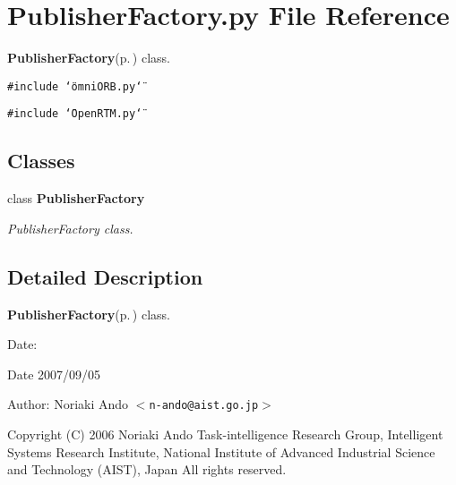 \section{Publisher\-Factory.py File Reference}
\label{PublisherFactory_8py}
{\bf Publisher\-Factory}{\rm (p.\,\pageref{classPublisherFactory})} class. 

{\tt \#include \char`\"{}omni\-ORB.py\char`\"{}}\par
{\tt \#include \char`\"{}Open\-RTM.py\char`\"{}}\par
\subsection*{Classes}
\begin{CompactItemize}
\item 
class {\bf Publisher\-Factory}
\begin{CompactList}\small\item\em Publisher\-Factory class. \item\end{CompactList}\end{CompactItemize}


\subsection{Detailed Description}
{\bf Publisher\-Factory}{\rm (p.\,\pageref{classPublisherFactory})} class. 

\begin{Desc}
\item[Date:]\begin{Desc}
\item[Date]2007/09/05\end{Desc}
\end{Desc}
\begin{Desc}
\item[Author:]Noriaki Ando $<${\tt n-ando@aist.go.jp}$>$\end{Desc}
Copyright (C) 2006 Noriaki Ando Task-intelligence Research Group, Intelligent Systems Research Institute, National Institute of Advanced Industrial Science and Technology (AIST), Japan All rights reserved.